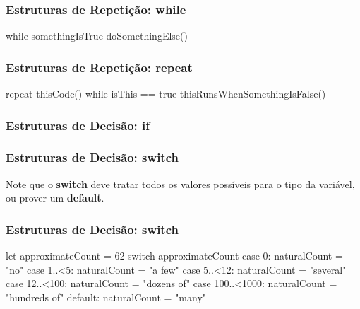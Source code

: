 \begin{frame}[fragile]
    \frametitle{Estruturas de Repetição: \textbf{while}}

    \begin{swift}
        while somethingIsTrue {
            doSomethingElse()
        }
    \end{swift}
\end{frame}

\begin{frame}[fragile]
    \frametitle{Estruturas de Repetição: \textbf{repeat}}

    \begin{swift}
        repeat
            thisCode()
        while isThis == true
        thisRunsWhenSomethingIsFalse()
    \end{swift}
\end{frame}

\begin{frame}[fragile]
    \frametitle{Estruturas de Decisão: \textbf{if}}

\end{frame}

\begin{frame}[fragile]
    \frametitle{Estruturas de Decisão: \textbf{switch}}

    \vspace{.5cm}
    Note que o \textbf{switch} deve tratar todos os valores possíveis
    para o tipo da variável, ou prover um \textbf{default}.
\end{frame}

\begin{frame}[fragile]
    \frametitle{Estruturas de Decisão: \textbf{switch}}

    \begin{swift}
        let approximateCount = 62
        switch approximateCount {
        case 0:
            naturalCount = "no"
        case 1..<5:
            naturalCount = "a few"
        case 5..<12:
            naturalCount = "several"
        case 12..<100:
            naturalCount = "dozens of"
        case 100..<1000:
            naturalCount = "hundreds of"
        default:
            naturalCount = "many"
        }
    \end{swift}
\end{frame}

